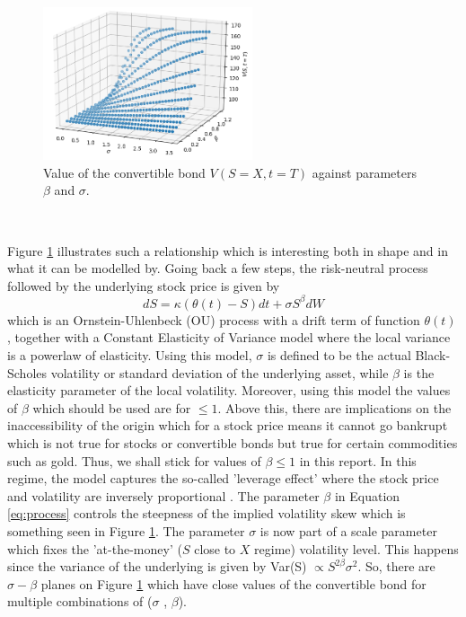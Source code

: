 \documentclass{article}
\begin{document}
\begin{figure}[!bh]
\includegraphics[width=0.55\textwidth,center]{../images/3d_european_varying_s_varying_sigma_varying_beta.png}
\caption{Value of the convertible bond $V(S=X,t=T)$ against parameters $\beta$ and $\sigma$.}
\label{fig:3d_relationship}
\end{figure}
\\
\par Figure \ref{fig:3d_relationship} illustrates such a relationship which is interesting both in shape and in what it can be modelled by.
Going back a few steps, the risk-neutral process followed by the underlying stock price is given by
 \begin{equation}
  dS = \kappa ( \theta (t)-S)dt+\sigma S^{\beta}dW
  \label{eq:process}
\end{equation}
which is an Ornstein-Uhlenbeck (OU) process \cite{thierfelder2015trending} with a drift term of function $\theta(t)$ , together with a Constant Elasticity of Variance \cite{cev} model where the local variance is a powerlaw of elasticity.
Using this model, $\sigma$ is defined to be the actual Black-Scholes volatility or standard deviation of the underlying asset, while $\beta$ is the elasticity parameter of the local volatility.
Moreover, using this model the values of $\beta$ which should be used are for $\leq1$.
Above this, there are implications on the inaccessibility of the origin which for a stock price means it cannot go bankrupt which is not true for stocks or convertible bonds but true for certain commodities such as gold.
Thus, we shall stick for values of $\beta\leq1$ in this report.
In this regime, the model captures the so-called 'leverage effect' where the stock price and volatility are inversely proportional \cite{chan}.
The parameter $\beta$ in Equation \ref{eq:process} controls the steepness of the implied volatility skew which is something seen in Figure \ref{fig:3d_relationship}.
The parameter $\sigma$ is now part of a scale parameter which fixes the 'at-the-money' ($S$ close to $X$ regime) volatility level.
This happens since the variance of the underlying is given by Var(S) $\propto S^{2\beta}\sigma^{2} $.
So, there are $\sigma-\beta$ planes on Figure \ref{fig:3d_relationship} which have close values of the convertible bond for multiple combinations of ($\sigma$ , $\beta$).
\end{document}
